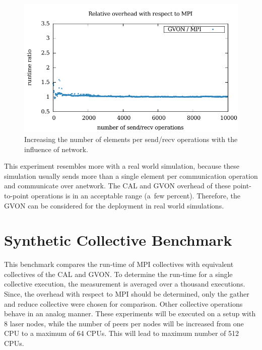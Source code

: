 \begin{figure}[H]
\begin{minipage}[t]{0.5\textwidth}
    \includegraphics[width=\textwidth]{plots/50_nsize_network_overhead_gvon_laser}
  \end{minipage}%
  \caption{Increasing the number of elements per send/recv operations
    with the influence of network.}
  \label{fig:nsend_network}
\end{figure}

\noindent This experiment resembles more with a real world simulation,
because these simulation usually sends more than a single element per
communication operation and communicate over anetwork.  The CAL and
GVON overhead of these point-to-point operations is in an acceptable
range (a~few percent).  Therefore, the GVON can be considered for the
deployment in real world simulations.


\section{Synthetic Collective Benchmark}
This benchmark compares the run-time of MPI collectives with
equivalent collectives of the CAL and GVON.  To determine the run-time
for a single collective execution, the measurement is averaged over a
thousand executions.  Since, the overhead with respect to MPI should be
determined, only the gather and reduce collective were chosen for
comparison. Other collective operations behave in an analog
manner. These experiments will be executed on a setup with 8 laser
nodes, while the number of peers per nodes will be increased from one
CPU to a maximum of 64 CPUs.  This will lead to maximum number of 512
CPUs.

